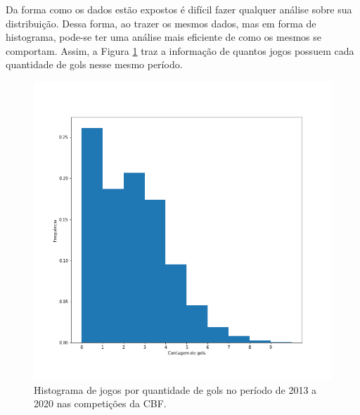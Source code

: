 \documentclass[11pt,letterpaper,twocolumn]{article}
\begin{document}

Da forma como os dados estão expostos é difícil fazer qualquer análise sobre sua distribuição. Dessa forma, ao trazer os mesmos dados, mas em forma de histograma, pode-se ter uma análise mais eficiente de como os mesmos se comportam. Assim, a Figura \ref{fig02p} traz a informação de quantos jogos possuem cada quantidade de gols nesse mesmo período.
\begin{figure}[hbt]
    \centering
    \includegraphics[scale = 0.40, center]{Poisson/fig02 - poisson.png}
    \caption{Histograma de jogos por quantidade de gols no período de 2013 a 2020 nas competições da CBF.}
    \label{fig02p}
\end{figure}
\end{document}
